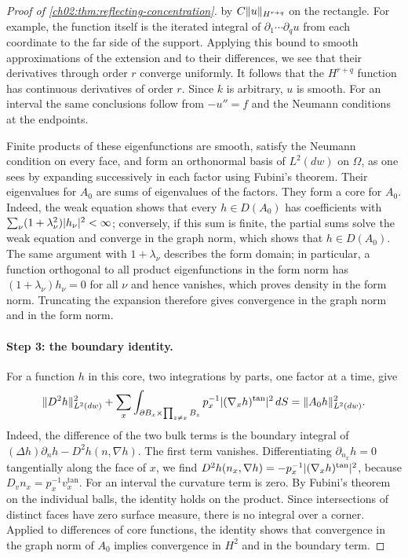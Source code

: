 \begin{proof}[Proof of \cref{ch02:thm:reflecting-concentration}]
by $C\lVert u\rVert_{H^{r+q}}$ on the rectangle. For example, the function itself is the iterated integral of $\partial_1\cdots\partial_qu$ from each coordinate to the far side of the support. Applying this bound to smooth approximations of the extension and to their differences, we see that their derivatives through order $r$ converge uniformly. It follows that the $H^{r+q}$ function has continuous derivatives of order $r$. Since $k$ is arbitrary, $u$ is smooth. For an interval the same conclusions follow from $-u''=f$ and the Neumann conditions at the endpoints.

Finite products of these eigenfunctions are smooth, satisfy the Neumann condition on every face, and form an orthonormal basis of $L^2(dw)$ on $\Omega$, as one sees by expanding successively in each factor using Fubini's theorem. Their eigenvalues for $A_0$ are sums of eigenvalues of the factors. They form a core for $A_0$. Indeed, the weak equation shows that every $h\in D(A_0)$ has coefficients with $\sum_\nu(1+\lambda_\nu^2)\lvert h_\nu\rvert^2<\infty$; conversely, if this sum is finite, the partial sums solve the weak equation and converge in the graph norm, which shows that $h\in D(A_0)$. The same argument with $1+\lambda_\nu$ describes the form domain; in particular, a function orthogonal to all product eigenfunctions in the form norm has $(1+\lambda_\nu)h_\nu=0$ for all $\nu$ and hence vanishes, which proves density in the form norm. Truncating the expansion therefore gives convergence in the graph norm and in the form norm.

\paragraph{Step 3: the boundary identity.} For a function $h$ in this core, two integrations by parts, one factor at a time, give
\begin{equation}\label{ch02:eq:neumann-core-identity}
 \lVert D^2h\rVert_{L^2(dw)}^2+\sum_x\int_{\partial B_x\times\prod_{z\ne x}B_z}p_x^{-1}\lvert (\nabla_xh)^{\mathrm{tan}}\rvert^2\,dS=\lVert A_0h\rVert_{L^2(dw)}^2.
\end{equation}
Indeed, the difference of the two bulk terms is the boundary integral of $(\Delta h)\partial_nh-D^2h(n,\nabla h)$. The first term vanishes. Differentiating $\partial_{n_x}h=0$ tangentially along the face of $x$, we find $D^2h(n_x,\nabla h)=-p_x^{-1}\lvert (\nabla_xh)^{\mathrm{tan}}\rvert^2$, because $D_vn_x=p_x^{-1}v_x^{\mathrm{tan}}$. For an interval the curvature term is zero. By Fubini's theorem on the individual balls, the identity holds on the product. Since intersections of distinct faces have zero surface measure, there is no integral over a corner. Applied to differences of core functions, the identity shows that convergence in the graph norm of $A_0$ implies convergence in $H^2$ and in the boundary term.


\end{proof}
